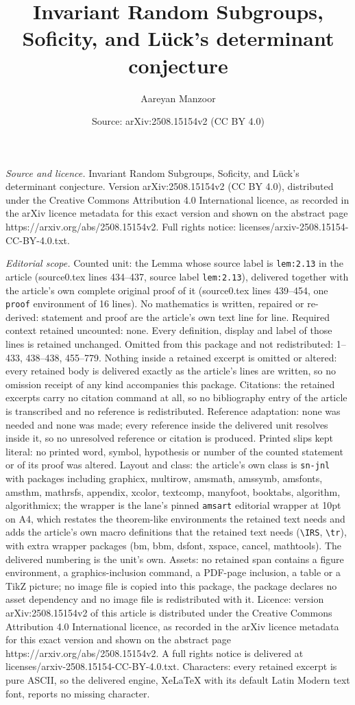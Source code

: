 \documentclass[10pt,a4paper]{amsart}
\title[Invariant Random Subgroups, Soficity, and L\"uck's determina]{Invariant Random Subgroups, Soficity, and L\"uck's determinant conjecture}
\author{Aareyan Manzoor}
\date{Source: arXiv:2508.15154v2 (CC BY 4.0)}
\begin{document}
\maketitle

\noindent\emph{Source and licence.} Invariant Random Subgroups, Soficity, and L\"uck's determinant conjecture. Version arXiv:2508.15154v2 (CC BY 4.0), distributed under the Creative Commons Attribution 4.0 International licence, as recorded in the arXiv licence metadata for this exact version and shown on the abstract page https://arxiv.org/abs/2508.15154v2. Full rights notice: licenses/arxiv-2508.15154-CC-BY-4.0.txt.\par\smallskip

\noindent\textit{Editorial scope.} Counted unit: the Lemma whose source label is \texttt{lem:2.13} in the article (source0.tex lines 434--437, source label \texttt{lem:2.13}), delivered together with the article's own complete original proof of it (source0.tex lines 439--454, one \texttt{proof} environment of 16 lines). No mathematics is written, repaired or re-derived: statement and proof are the article's own text line for line. Required context retained uncounted: none. Every definition, display and label of those lines is retained unchanged. Omitted from this package and not redistributed: 1--433, 438--438, 455--779. Nothing inside a retained excerpt is omitted or altered: every retained body is delivered exactly as the article's lines are written, so no omission receipt of any kind accompanies this package. Citations: the retained excerpts carry no citation command at all, so no bibliography entry of the article is transcribed and no reference is redistributed. Reference adaptation: none was needed and none was made; every reference inside the delivered unit resolves inside it, so no unresolved reference or citation is produced. Printed slips kept literal: no printed word, symbol, hypothesis or number of the counted statement or of its proof was altered. Layout and class: the article's own class is \texttt{sn-jnl} with packages including graphicx, multirow, amsmath, amssymb, amsfonts, amsthm, mathrsfs, appendix, xcolor, textcomp, manyfoot, booktabs, algorithm, algorithmicx; the wrapper is the lane's pinned \texttt{amsart} editorial wrapper at 10pt on A4, which restates the theorem-like environments the retained text needs and adds the article's own macro definitions that the retained text needs (\texttt{\textbackslash IRS}, \texttt{\textbackslash tr}), with extra wrapper packages (bm, bbm, dsfont, xspace, cancel, mathtools). The delivered numbering is the unit's own. Assets: no retained span contains a figure environment, a graphics-inclusion command, a PDF-page inclusion, a table or a TikZ picture; no image file is copied into this package, the package declares no asset dependency and no image file is redistributed with it. Licence: version arXiv:2508.15154v2 of this article is distributed under the Creative Commons Attribution 4.0 International licence, as recorded in the arXiv licence metadata for this exact version and shown on the abstract page https://arxiv.org/abs/2508.15154v2. A full rights notice is delivered at licenses/arxiv-2508.15154-CC-BY-4.0.txt. Characters: every retained excerpt is pure ASCII, so the delivered engine, XeLaTeX with its default Latin Modern text font, reports no missing character.
\end{document}

